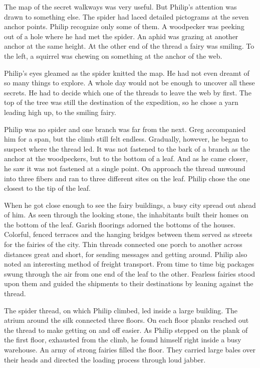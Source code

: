 \documentclass[10pt, draft]{memoir}
\begin{document}
The map of the secret walkways was very useful. But Philip's attention was
drawn to something else. The spider had laced detailed pictograms at the seven
anchor points. Philip recognize only some of them. A woodpecker was peeking out
of a hole where he had met the spider. An aphid was grazing at another anchor
at the same height. At the other end of the thread a fairy was smiling. To the
left, a squirrel was chewing on something at the anchor of the web.

Philip's eyes gleamed as the spider knitted the map. He had not even dreamt of
so many things to explore. A whole day would not be enough to uncover all these
secrets. He had to decide which one of the threads to leave the web by first.
The top of the tree was still the destination of the expedition, so he chose a
yarn leading high up, to the smiling fairy.

Philip was no spider and one branch was far from the next. Greg accompanied him
for a span, but the climb still felt endless. Gradually, however, he began to
suspect where the thread led. It was not fastened to the bark of a branch as
the anchor at the woodpeckers, but to the bottom of a leaf. And as he came
closer, he saw it was not fastened at a single point. On approach the thread
unwound into three fibers and ran to three different sites on the leaf.  Philip
chose the one closest to the tip of the leaf.

When he got close enough to see the fairy buildings, a busy city spread out
ahead of him. As seen through the looking stone, the inhabitants built their
homes on the bottom of the leaf. Garish floorings adorned the bottoms of the
houses. Colorful, fenced terraces and the hanging bridges between them served
as streets for the fairies of the city. Thin threads connected one porch to
another across distances great and short, for sending messages and getting
around. Philip also noted an interesting method of freight transport. From time
to time big packages swung through the air from one end of the leaf to the
other. Fearless fairies stood upon them and guided the shipments to their
destinations by leaning against the thread.

The spider thread, on which Philip climbed, led inside a large building. The
atrium around the silk connected three floors. On each floor planks reached out
the thread to make getting on and off easier. As Philip stepped on the plank of
the first floor, exhausted from the climb, he found himself right inside a busy
warehouse. An army of strong fairies filled the floor. They carried large bales
over their heads and directed the loading process through loud jabber.
\end{document}
